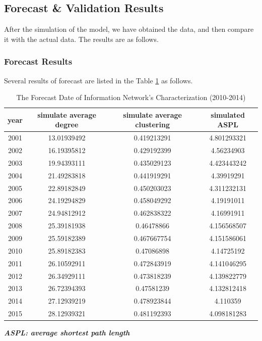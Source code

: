 \documentclass[a4paper,11pt]{article}
\begin{document}
\subsection{Forecast \& Validation Results}
\par After the simulation of the model, we have obtained the data, and then compare it with the actual data. The results are as follows.
\subsubsection{Forecast Results}
\par Several results of forecast are listed in the Table \ref{tab:addlabel} as follows.

\begin{table}[htbp]
  \centering
  \caption{The Forecast Date of Information Network's Characterization (2010-2014)}
    \begin{tabular}{cccc}
    \toprule
    year  & simulate average degree & simulate average clustering & simulated ASPL \\
    \midrule
    2001  & 13.01939492 & 0.419213291 & 4.801293321 \\
    2002  & 16.19395812 & 0.429192399 & 4.56234903 \\
    2003  & 19.94393111 & 0.435029123 & 4.423443242 \\
    2004  & 21.49283818 & 0.441919291 & 4.39919291 \\
    2005  & 22.89182849 & 0.450203023 & 4.311232131 \\
    2006  & 24.19294829 & 0.458049292 & 4.19191011 \\
    2007  & 24.94812912 & 0.462838322 & 4.16991911 \\
    2008  & 25.39181938 & 0.46478866 & 4.156568507 \\
    2009  & 25.59182389 & 0.467667754 & 4.151586061 \\
    2010  & 25.89182383 & 0.47086898 & 4.14725192 \\
    2011  & 26.10592911 & 0.472843919 & 4.141046295 \\
    2012  & 26.34929111 & 0.473818239 & 4.139822779 \\
    2013  & 26.72394393 & 0.47581239 & 4.132812418 \\
    2014  & 27.12939219 & 0.478923844 & 4.110359 \\
    2015  & 28.12939321 & 0.481192393 & 4.098181283 \\
    \bottomrule
    \end{tabular}%
  \label{tab:addlabel}%
\end{table}%
\textbf{\emph{ASPL: average shortest path length}}
\end{document}
